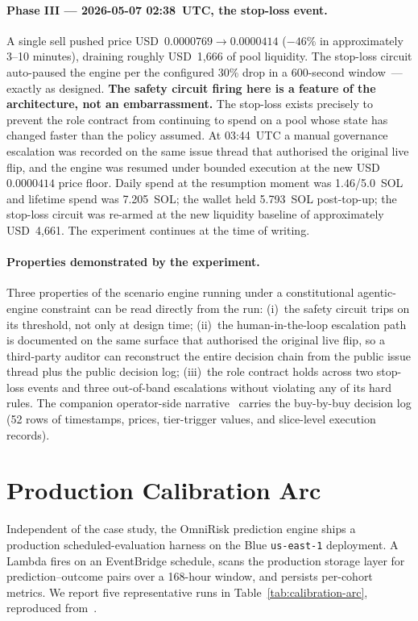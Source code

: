\documentclass[11pt,a4paper]{article}
\begin{document}
\paragraph{Phase III --- 2026-05-07 02:38~UTC, the stop-loss event.}
A single sell pushed price USD~$0.0000769 \to 0.0000414$
($-46\%$ in approximately 3--10 minutes), draining roughly USD~1{,}666
of pool liquidity. The stop-loss circuit auto-paused the engine per
the configured 30\% drop in a 600-second window~--- exactly as designed.
\textbf{The safety circuit firing here is a feature of the architecture,
not an embarrassment.} The stop-loss exists precisely to prevent the
role contract from continuing to spend on a pool whose state has changed
faster than the policy assumed. At 03:44~UTC a manual governance
escalation was recorded on the same issue thread that authorised the
original live flip, and the engine was resumed under bounded execution
at the new USD~$0.0000414$ price floor. Daily spend at the resumption
moment was 1.46/5.0~SOL and lifetime spend was 7.205~SOL; the wallet
held 5.793~SOL post-top-up; the stop-loss circuit was re-armed at the
new liquidity baseline of approximately USD~4{,}661. The experiment
continues at the time of writing.

\paragraph{Properties demonstrated by the experiment.} Three properties
of the scenario engine running under a constitutional agentic-engine
constraint can be read directly from the run: (i)~the safety circuit
trips on its threshold, not only at design time; (ii)~the
human-in-the-loop escalation path is documented on the same surface that
authorised the original live flip, so a third-party auditor can
reconstruct the entire decision chain from the public issue thread plus
the public decision log; (iii)~the role contract holds across two
stop-loss events and three out-of-band escalations without violating any
of its hard rules. The companion operator-side
narrative~\cite{omnirisk2026defending} carries the buy-by-buy decision
log (52 rows of timestamps, prices, tier-trigger values, and slice-level
execution records).

\section{Production Calibration Arc}\label{sec:metrics}\label{sec:case-study:prediction-router}

Independent of the case study, the OmniRisk prediction engine ships a
production scheduled-evaluation harness on the Blue \texttt{us-east-1}
deployment. A Lambda fires on an EventBridge schedule, scans the
production storage layer for prediction--outcome pairs over a 168-hour
window, and persists per-cohort metrics. We report five representative
runs in Table~\ref{tab:calibration-arc}, reproduced
from~\cite{omnirisk2026predmetrics}.
\end{document}
